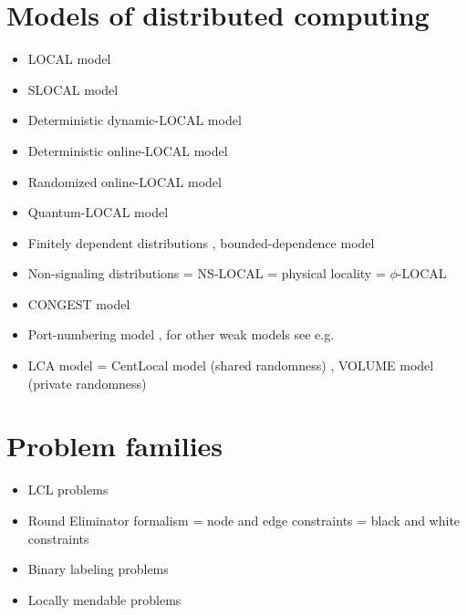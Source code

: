 \documentclass[a4paper,11pt]{article}
\begin{document}
\section{Models of distributed computing}
\begin{itemize}
    \item LOCAL model \cite{linial-1992-locality-in-distributed-graph-algorithms,peleg-2000-distributed-computing-a-locality-sensitive}
    \item SLOCAL model \cite{ghaffari-kuhn-maus-2017-on-the-complexity-of-local}
    \item Deterministic dynamic-LOCAL model \cite{akbari-eslami-etal-2023-locality-in-online-dynamic}
    \item Deterministic online-LOCAL model \cite{akbari-eslami-etal-2023-locality-in-online-dynamic}
    \item Randomized online-LOCAL model \cite{akbari-coiteux-roy-etal-2025-online-locality-meets}
    \item Quantum-LOCAL model \cite{gavoille-kosowski-markiewicz-2009-what-can-be-observed,arfaoui-fraigniaud-2014-what-can-be-computed-without}
    \item Finitely dependent distributions \cite{burton-goulet-meester-1993-on-1-dependent-processes-and,holroyd-liggett-2016-finitely-dependent-coloring}, bounded-dependence model \cite{akbari-coiteux-roy-etal-2025-online-locality-meets}
    \item Non-signaling distributions = NS-LOCAL = physical locality = $\phi$-LOCAL \cite{gavoille-kosowski-markiewicz-2009-what-can-be-observed,arfaoui-fraigniaud-2014-what-can-be-computed-without}
    \item CONGEST model \cite{peleg-2000-distributed-computing-a-locality-sensitive}
    \item Port-numbering model \cite{angluin-1980-local-and-global-properties-in-networks-of}, for other weak models see e.g.\ \cite{hella-jarvisalo-etal-2015-weak-models-of-distributed}
    \item LCA model = CentLocal model (shared randomness) \cite{rubinfeld-tamir-etal-2011-fast-local-computation}, VOLUME model (private randomness) \cite{rosenbaum-suomela-2020-seeing-far-vs-seeing-wide-volume}
\end{itemize}

\section{Problem families}
\begin{itemize}
    \item LCL problems \cite{naor-stockmeyer-1995-what-can-be-computed-locally}
    \item Round Eliminator formalism = node and edge constraints = black and white constraints \cite{olivetti-2020-brief-announcement-round-eliminator-a,olivetti-2025-round-eliminator-a-tool-for-automatic}
    \item Binary labeling problems \cite{balliu-brandt-etal-2020-classification-of-distributed}
    \item Locally mendable problems \cite{balliu-hirvonen-etal-2022-local-mending}
\end{itemize}
\end{document}
